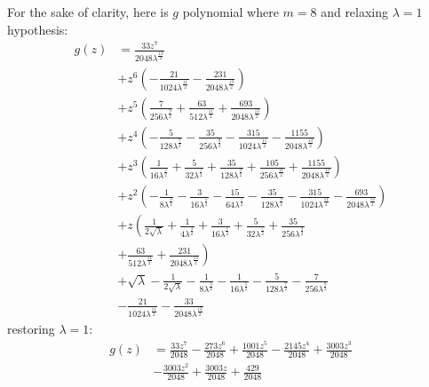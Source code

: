 For the sake of clarity, here is $g$ polynomial where $m=8$ and relaxing $\lambda=1$ hypothesis:
\begin{displaymath}
\begin{split}
g{\left (z \right )} &= \frac{33 z^{7}}{2048 \lambda^{\frac{13}{2}}} \\
&+ z^{6} \left(- \frac{21}{1024 \lambda^{\frac{11}{2}}} - \frac{231}{2048 \lambda^{\frac{13}{2}}}\right) \\
&+ z^{5} \left(\frac{7}{256 \lambda^{\frac{9}{2}}} + \frac{63}{512 \lambda^{\frac{11}{2}}} + \frac{693}{2048 \lambda^{\frac{13}{2}}}\right) \\
&+ z^{4} \left(- \frac{5}{128 \lambda^{\frac{7}{2}}} - \frac{35}{256 \lambda^{\frac{9}{2}}} - \frac{315}{1024 \lambda^{\frac{11}{2}}} - \frac{1155}{2048 \lambda^{\frac{13}{2}}}\right) \\
&+ z^{3} \left(\frac{1}{16 \lambda^{\frac{5}{2}}} + \frac{5}{32 \lambda^{\frac{7}{2}}} + \frac{35}{128 \lambda^{\frac{9}{2}}} + \frac{105}{256 \lambda^{\frac{11}{2}}} + \frac{1155}{2048 \lambda^{\frac{13}{2}}}\right) \\
&+ z^{2} \left(- \frac{1}{8 \lambda^{\frac{3}{2}}} - \frac{3}{16 \lambda^{\frac{5}{2}}} - \frac{15}{64 \lambda^{\frac{7}{2}}} - \frac{35}{128 \lambda^{\frac{9}{2}}} - \frac{315}{1024 \lambda^{\frac{11}{2}}} - \frac{693}{2048 \lambda^{\frac{13}{2}}}\right) \\
&+ z \left(\frac{1}{2 \sqrt{\lambda}} + \frac{1}{4 \lambda^{\frac{3}{2}}} + \frac{3}{16 \lambda^{\frac{5}{2}}} + \frac{5}{32 \lambda^{\frac{7}{2}}} + \frac{35}{256 \lambda^{\frac{9}{2}}} \right. \\
    &+ \left. \frac{63}{512 \lambda^{\frac{11}{2}}} + \frac{231}{2048 \lambda^{\frac{13}{2}}}\right) \\
&+ \sqrt{\lambda} - \frac{1}{2 \sqrt{\lambda}} - \frac{1}{8 \lambda^{\frac{3}{2}}} - \frac{1}{16 \lambda^{\frac{5}{2}}} - \frac{5}{128 \lambda^{\frac{7}{2}}} - \frac{7}{256 \lambda^{\frac{9}{2}}} \\
&- \frac{21}{1024 \lambda^{\frac{11}{2}}} - \frac{33}{2048 \lambda^{\frac{13}{2}}}
\end{split}
\end{displaymath}
restoring $\lambda=1$:
\begin{displaymath}
\begin{split}
g{\left (z \right )} &= \frac{33 z^{7}}{2048} - \frac{273 z^{6}}{2048} + \frac{1001 z^{5}}{2048} - \frac{2145 z^{4}}{2048} + \frac{3003 z^{3}}{2048} \\
&- \frac{3003 z^{2}}{2048} + \frac{3003 z}{2048} + \frac{429}{2048}
\end{split}
\end{displaymath}

